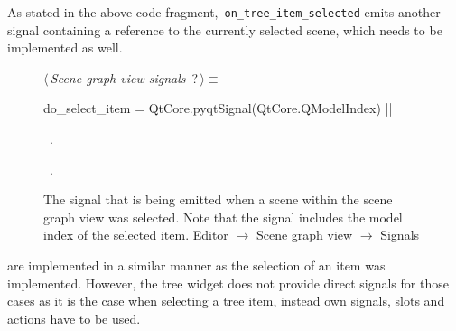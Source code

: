 \documentclass[%
    a4paper,    %
    justified,  %
    nobib,      %
    openany     %
]{tufte-book}
\begin{document}
As stated in the above code fragment,~\verb=on_tree_item_selected= emits another
signal containing a reference to the currently selected scene, which needs to be
implemented as well.

\begin{figure}
\begin{flushleft} \small
\begin{minipage}{\linewidth}\label{scrap45}\raggedright\small
{} $\langle\,${\itshape Scene graph view signals}\nobreak\ {\footnotesize {?}}$\,\rangle\equiv$
\vspace{-1ex}
\begin{pythoncode}
do_select_item = QtCore.pyqtSignal(QtCore.QModelIndex)
|\NWsep|
\end{pythoncode}
\vspace{1.5ex}
\footnotesize
\begin{list}{}{\setlength{\itemsep}{-\parsep}\setlength{\itemindent}{-\leftmargin}}
\item \NWtxtMacroDefBy\ .
\item \NWtxtMacroRefIn\ .

\item{}
\end{list}
\end{minipage}\vspace{4ex}
\end{flushleft}
\caption{The signal that is being emitted when a scene within the scene graph
view was selected. Note that the signal includes the model index of the selected
item.
  \newline{}\newline{}Editor $\rightarrow$ Scene graph view
  $\rightarrow$ Signals}
\label{editor:lst:scene-graph-view:signals:do-select-item}
\end{figure}

 are implemented in a similar manner
as the selection of an item was implemented. However, the tree widget does not
provide direct signals for those cases as it is the case when selecting a tree
item, instead own signals, slots and actions have to be used.
\end{document}

